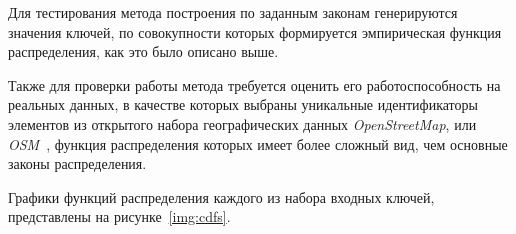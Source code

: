 Для тестирования метода построения по заданным законам генерируются значения
ключей, по совокупности которых формируется эмпирическая функция распределения,
как это было описано выше.

Также для проверки работы метода требуется оценить его работоспособность на
реальных данных, в качестве которых выбраны уникальные идентификаторы элементов
из открытого набора географических данных \textit{OpenStreetMap}, или
\textit{OSM}~\cite{osm}, функция распределения которых имеет более сложный вид,
чем основные законы распределения.

Графики функций распределения каждого из набора входных ключей, представлены на
рисунке~\ref{img:cdfs}.

